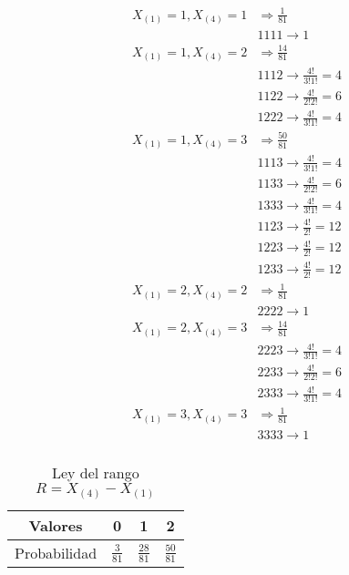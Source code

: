 \documentclass{article}
\begin{document}
      \begin{align*}
        X_{(1)} = 1,X_{(4)} = 1 & \Rightarrow \frac{1}{81}\\
        &1111 \rightarrow 1 \\
        X_{(1)} = 1,X_{(4)} = 2 & \Rightarrow \frac{14}{81}\\
        &1112 \rightarrow \frac{4!}{3!1!} = 4 \\
        &1122 \rightarrow \frac{4!}{2!2!} = 6  \\
        &1222 \rightarrow \frac{4!}{3!1!} = 4  \\
        X_{(1)} = 1,X_{(4)} = 3 & \Rightarrow \frac{50}{81}\\
        &1113 \rightarrow \frac{4!}{3!1!} = 4 \\
        &1133 \rightarrow \frac{4!}{2!2!} = 6  \\
        &1333 \rightarrow \frac{4!}{3!1!} = 4  \\
        &1123 \rightarrow \frac{4!}{2!} = 12 \\
        &1223 \rightarrow \frac{4!}{2!} = 12  \\
        &1233 \rightarrow \frac{4!}{2!} = 12  \\
        X_{(1)} = 2,X_{(4)} = 2 & \Rightarrow \frac{1}{81}\\
        &2222 \rightarrow 1 \\
        X_{(1)} = 2,X_{(4)} = 3 & \Rightarrow \frac{14}{81}\\
        &2223 \rightarrow \frac{4!}{3!1!} = 4 \\
        &2233 \rightarrow \frac{4!}{2!2!} = 6  \\
        &2333 \rightarrow \frac{4!}{3!1!} = 4  \\
        X_{(1)} = 3,X_{(4)} = 3 & \Rightarrow \frac{1}{81}\\
        &3333 \rightarrow 1 \\
      \end{align*}


      \begin{table}[H]
        \centering
        \begin{tabular}{ c | c c c |}
          Valores       & 0             & 1             & 2 \\ \hline
          Probabilidad  & $\frac{3}{81}$  & $\frac{28}{81}$ & $\frac{50}{81}$
        \end{tabular}
        \caption{Ley del rango $R=X_{(4)} - X_{(1)}$}
        \label{}

      \end{table}
\end{document}
